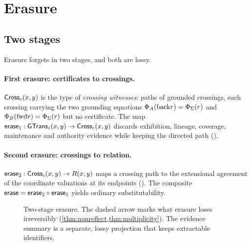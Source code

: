 \section{Erasure}\label{sec:erasure}

\subsection{Two stages}
Erasure forgets in two stages, and both are lossy.

\paragraph{First erasure: certificates to crossings.}
$\mathsf{Cross}_c(x,y)$ is the type of \emph{crossing witnesses}: paths of grounded crossings, each crossing carrying the two grounding equations $\Phi_A(\mathrm{back} r) = \Phi_\Sigma(r)$ and $\Phi_B(\mathrm{fwd} r) = \Phi_\Sigma(r)$ but no certificate. The map $\mathsf{erase}_1 : \mathsf{GTrans}_c(x,y) \to \mathsf{Cross}_c(x,y)$ discards exhibition, lineage, coverage, maintenance and authority evidence while keeping the directed path ().

\paragraph{Second erasure: crossings to relation.}
$\mathsf{erase}_2 : \mathsf{Cross}_c(x,y) \to R(x,y)$ maps a crossing path to the extensional agreement of the coordinate valuations at its endpoints (). The composite $\mathsf{erase} = \mathsf{erase}_2 \circ \mathsf{erase}_1$ yields ordinary substitutability.

\begin{figure}[t]
\centering
{}
\caption{Two-stage erasure. The dashed arrow marks what erasure loses irreversibly (\cref{thm:nonreflect,thm:multiplicity}). The evidence summary is a separate, lossy projection that keeps extractable identifiers.}
\label{fig:erasure}
\end{figure}

